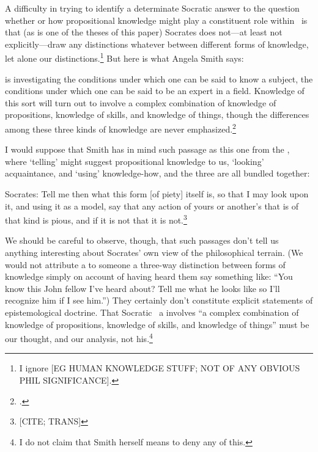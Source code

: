 \documentclass[11pt,letterpaper,oneside]{amsart} %
\begin{document}
A difficulty in trying to identify a determinate Socratic answer to the question whether or how propositional knowledge might play a constituent role within \techne\ is that (as is one of the theses of this paper) Socrates does not---at least not explicitly---draw any distinctions whatever between different forms of knowledge, let alone our distinctions.\footnote{I ignore [EG HUMAN KNOWLEDGE STUFF; NOT OF ANY OBVIOUS PHIL SIGNIFICANCE].} But here is what Angela Smith says:\begin{squote}[Socrates] is investigating the conditions under which one can be said to know a subject, the conditions under which one can be said to be an expert in a field. Knowledge of this sort will turn out to involve a complex combination of knowledge of propositions, knowledge of skills, and knowledge of things, though the differences among these three kinds of knowledge are never emphasized.\footnote{\citet[p.\ XX]{asmith1998}.}\end{squote} I would suppose that Smith has in mind such passage as this one from the , where `telling' might suggest propositional knowledge to us, `looking' acquaintance, and `using' knowledge-how, and the three are all bundled together:\begin{squote}Socrates: Tell me then what this form [of piety] itself is, so that I may look upon it, and using it as a model, say that any action of yours or another's that is of that kind is pious, and if it is not that it is not.\footnote{[CITE; TRANS]}\end{squote} We should be careful to observe, though, that such passages don't tell us anything interesting about Socrates' own view of the philosophical terrain. (We would not attribute a to someone a three-way distinction between forms of knowledge simply on account of having heard them say something like: ``You know this John fellow I've heard about? Tell me what he looks like so I'll recognize him if I see him.'') They certainly don't constitute explicit statements of epistemological doctrine. That Socratic \techne\ a involves ``a complex combination of knowledge of propositions, knowledge of skills, and knowledge of things'' must be our thought, and our analysis, not his.\footnote{I do not claim that Smith herself means to deny any of this.}


\end{document}
